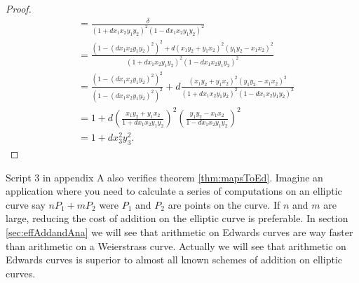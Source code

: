 \begin{proof}
\begin{align*}
	&= \frac{\delta}{(1+dx_1x_2y_1y_2)^2(1-dx_1x_2y_1y_2)^2} \\
	&= \frac{(1-(dx_1x_2y_1y_2)^2)^2+d(x_1y_2+y_1x_2)^2(y_1y_2-x_1x_2)^2}{(1+dx_1x_2y_1y_2)^2(1-dx_1x_2y_1y_2)^2} \\
	&= \frac{(1-(dx_1x_2y_1y_2)^2)^2}{(1-(dx_1x_2y_1y_2)^2)^2}+d\frac{(x_1y_2+y_1x_2)^2(y_1y_2-x_1x_2)^2}{(1+dx_1x_2y_1y_2)^2(1-dx_1x_2y_1y_2)^2} \\
	&=1+d\left(\frac{x_1y_2+y_1x_2}{1+dx_1x_2y_1y_2}\right)^2\left(\frac{y_1y_2-x_1x_2}{1-dx_1x_2y_1y_2}\right)^2 \\
	&= 1+dx_3^2y_3^2.
\end{align*}
\end{proof}
Script 3 in appendix A also verifies theorem \ref{thm:mapsToEd}. Imagine an application where you need to calculate a series of computations on an elliptic curve say $nP_1+mP_2$ were $P_1$ and $P_2$ are points on the curve. If $n$ and $m$ are large, reducing the cost of addition on the elliptic curve is preferable. In section \ref{sec:effAddandAna} we will see that arithmetic on Edwards curves are way faster than arithmetic on a Weierstrass curve. Actually we will see that arithmetic on Edwards curves is superior to almost all known schemes of addition on elliptic curves. 


